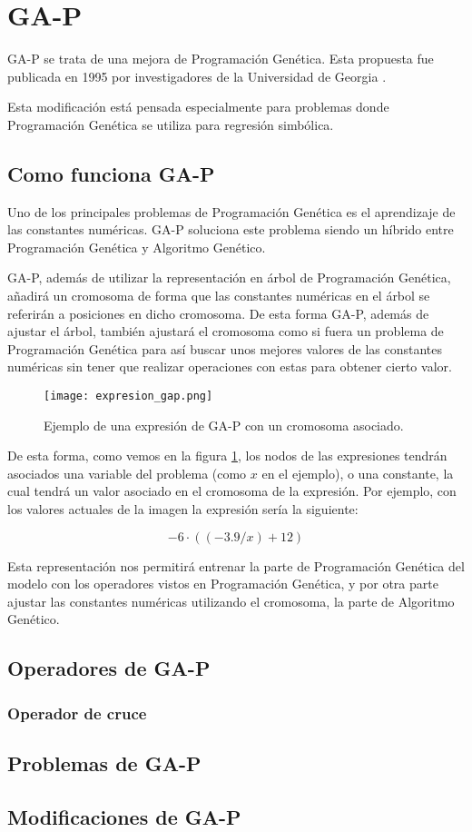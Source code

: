 \section{GA-P}

GA-P se trata de una mejora de Programación Genética. Esta propuesta fue publicada en 1995 por investigadores de la Universidad de Georgia \cite{primerGAP}.

Esta modificación está pensada especialmente para problemas donde Programación Genética se utiliza para regresión simbólica.

\subsection{Como funciona GA-P}

Uno de los principales problemas de Programación Genética es el aprendizaje de las constantes numéricas. GA-P soluciona este problema siendo un híbrido entre Programación Genética y Algoritmo Genético.

GA-P, además de utilizar la representación en árbol de Programación Genética, añadirá un cromosoma de forma que las constantes numéricas en el árbol se referirán a posiciones en dicho cromosoma. De esta forma GA-P, además de ajustar el árbol, también ajustará el cromosoma como si fuera un problema de Programación Genética para así buscar unos mejores valores de las constantes numéricas sin tener que realizar operaciones con estas para obtener cierto valor.

\begin{figure}[H]
    \centering
	  \texttt{[image: expresion\_gap.png]}
    \caption{Ejemplo de una expresión de GA-P con un cromosoma asociado.}
	 \label{fig:expresion_gap}
\end{figure}

De esta forma, como vemos en la figura \ref{fig:expresion_gap}, los nodos de las expresiones tendrán asociados una variable del problema (como $x$ en el ejemplo), o una constante, la cual tendrá un valor asociado en el cromosoma de la expresión. Por ejemplo, con los valores actuales de la imagen la expresión sería la siguiente:

$$ -6 \cdot ( (-3.9 / x) + 12 ) $$

Esta representación nos permitirá entrenar la parte de Programación Genética del modelo con los operadores vistos en Programación Genética, y por otra parte ajustar las constantes numéricas utilizando el cromosoma, la parte de Algoritmo Genético.

\subsection{Operadores de GA-P}

\subsubsection{Operador de cruce}

\subsection{Problemas de GA-P}

\subsection{Modificaciones de GA-P}
